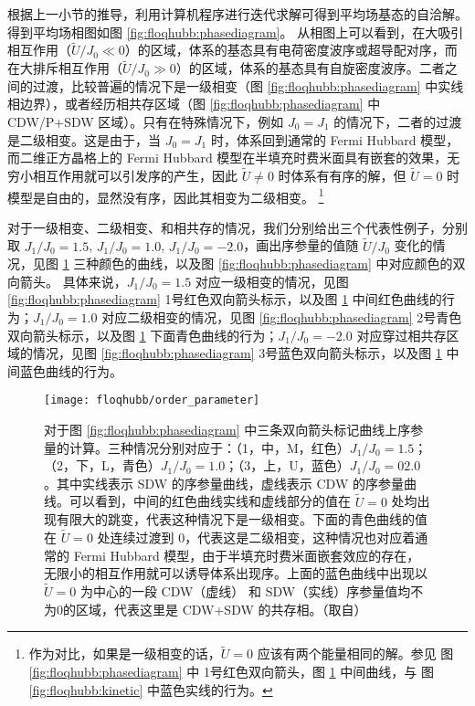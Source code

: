 根据上一小节的推导，利用计算机程序进行迭代求解可得到平均场基态的自洽解。得到平均场相图如图 \ref{fig:floqhubb:phasediagram}。
从相图上可以看到，在大吸引相互作用（$\tilde{U}/J_0\ll0$）的区域，体系的基态具有电荷密度波序或超导配对序，而在大排斥相互作用（$\tilde{U}/J_0\gg0$）的区域，体系的基态具有自旋密度波序。二者之间的过渡，比较普遍的情况下是一级相变（图 \ref{fig:floqhubb:phasediagram} 中实线相边界），或者经历相共存区域（图 \ref{fig:floqhubb:phasediagram} 中 CDW/P+SDW 区域）。只有在特殊情况下，例如 $J_0=J_1$ 的情况下，二者的过渡是二级相变。这是由于，当 $J_0=J_1$ 时，体系回到通常的 Fermi Hubbard 模型，而二维正方晶格上的 Fermi Hubbard 模型在半填充时费米面具有嵌套的效果，无穷小相互作用就可以引发序的产生，因此 $\tilde{U}\neq0$ 时体系有有序的解，但 $\tilde{U}=0$ 时模型是自由的，显然没有序，因此其相变为二级相变。
\footnote{作为对比，如果是一级相变的话，$\tilde{U}=0$ 应该有两个能量相同的解。参见
图 \ref{fig:floqhubb:phasediagram} 中 1号红色双向箭头，图 \ref{fig:floqhubb:orderparameter} 中间曲线，与
图 \ref{fig:floqhubb:kinetic} 中蓝色实线的行为。}

对于一级相变、二级相变、和相共存的情况，我们分别给出三个代表性例子，分别取 $J_1/J_0=1.5$, $J_1/J_0=1.0$, $J_1/J_0=-2.0$，画出序参量的值随 $\tilde{U}/J_0$ 变化的情况，见图 \ref{fig:floqhubb:orderparameter} 三种颜色的曲线，以及图 \ref{fig:floqhubb:phasediagram} 中对应颜色的双向箭头。 具体来说，$J_1/J_0=1.5$ 对应一级相变的情况，见图 \ref{fig:floqhubb:phasediagram} 1号红色双向箭头标示，以及图 \ref{fig:floqhubb:orderparameter} 中间红色曲线的行为；$J_1/J_0=1.0$ 对应二级相变的情况，见图 \ref{fig:floqhubb:phasediagram} 2号青色双向箭头标示，以及图 \ref{fig:floqhubb:orderparameter} 下面青色曲线的行为；$J_1/J_0=-2.0$ 对应穿过相共存区域的情况，见图 \ref{fig:floqhubb:phasediagram} 3号蓝色双向箭头标示，以及图 \ref{fig:floqhubb:orderparameter} 中间蓝色曲线的行为。

\begin{figure}
\centering
\texttt{[image: floqhubb/order\_parameter]}
\caption{对于图 \ref{fig:floqhubb:phasediagram} 中三条双向箭头标记曲线上序参量的计算。三种情况分别对应于：（1，中，M，红色）$J_1/J_0=1.5$；（2，下，L，青色）$J_1/J_0=1.0$；（3，上，U，蓝色）$J_1/J_0=02.0$。其中实线表示 SDW 的序参量曲线，虚线表示 CDW 的序参量曲线。可以看到，中间的红色曲线实线和虚线部分的值在 $\tilde{U}=0$ 处均出现有限大的跳变，代表这种情况下是一级相变。下面的青色曲线的值在 $\tilde{U}=0$ 处连续过渡到 0，代表这是二级相变，这种情况也对应着通常的 Fermi Hubbard 模型，由于半填充时费米面嵌套效应的存在，无限小的相互作用就可以诱导体系出现序\cite{nagaosa}。上面的蓝色曲线中出现以 $\tilde{U}=0$ 为中心的一段 CDW（虚线） 和 SDW（实线）序参量值均不为0的区域，代表这里是 CDW+SDW 的共存相。（取自）}
\label{fig:floqhubb:orderparameter}
\end{figure}

